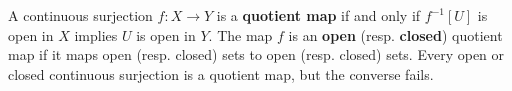 A continuous surjection $f: X \to Y$ is a \textbf{quotient map} if and only if $f^{-1}[U]$ is open in $X$ implies $U$ is open in $Y$. The map $f$ is an \textbf{open} (resp. \textbf{closed}) quotient map if it maps open (resp. closed) sets to open (resp. closed) sets. Every open or closed continuous surjection is a quotient map, but the converse fails.
